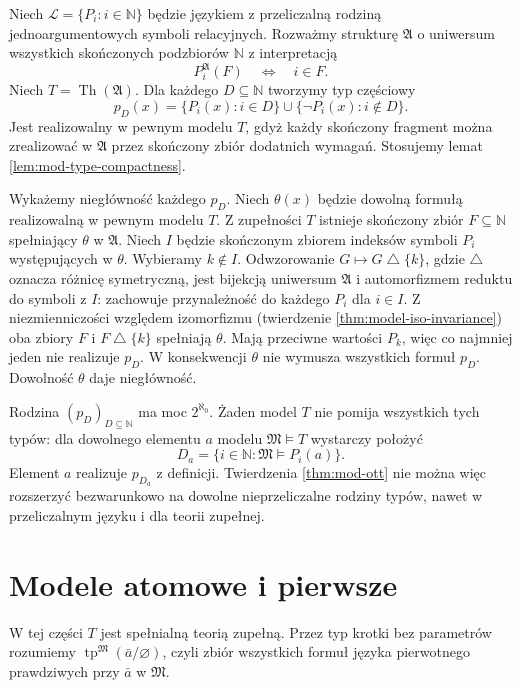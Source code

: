 \begin{przyklad}
\label{ex:mod-ott-uncountable-family}
Niech $\mathcal L=\{P_i:i\in\mathbb N\}$ będzie
językiem z przeliczalną rodziną jednoargumentowych
symboli relacyjnych. Rozważmy strukturę
$\mathfrak A$ o uniwersum wszystkich skończonych
podzbiorów $\mathbb N$ z interpretacją
\[
P_i^{\mathfrak A}(F)\quad\Longleftrightarrow\quad i\in F.
\]
Niech $T=\operatorname{Th}(\mathfrak A)$.
Dla każdego $D\subseteq\mathbb N$ tworzymy typ częściowy
\[
p_D(x)=\{P_i(x):i\in D\}
\cup\{\neg P_i(x):i\notin D\}.
\]
Jest realizowalny w pewnym modelu $T$, gdyż
każdy skończony fragment można zrealizować
w $\mathfrak A$ przez skończony zbiór dodatnich
wymagań. Stosujemy lemat \ref{lem:mod-type-compactness}.

Wykażemy niegłówność każdego $p_D$.
Niech $\theta(x)$ będzie dowolną formułą
realizowalną w pewnym modelu $T$.
Z zupełności $T$ istnieje skończony zbiór
$F\subseteq\mathbb N$ spełniający $\theta$ w
$\mathfrak A$. Niech $I$ będzie skończonym
zbiorem indeksów symboli $P_i$ występujących
w $\theta$. Wybieramy $k\notin I$. Odwzorowanie
$G\mapsto G\mathbin{\triangle}\{k\}$, gdzie
$\triangle$ oznacza różnicę symetryczną, jest
bijekcją uniwersum $\mathfrak A$ i automorfizmem
reduktu do symboli z $I$: zachowuje przynależność
do każdego $P_i$ dla $i\in I$.
Z niezmienniczości względem izomorfizmu
(twierdzenie \ref{thm:model-iso-invariance})
oba zbiory $F$ i $F\mathbin{\triangle}\{k\}$
spełniają $\theta$. Mają przeciwne wartości $P_k$,
więc co najmniej jeden nie realizuje $p_D$.
W konsekwencji $\theta$ nie wymusza wszystkich
formuł $p_D$. Dowolność $\theta$ daje niegłówność.

Rodzina $(p_D)_{D\subseteq\mathbb N}$ ma moc
$2^{\aleph_0}$. Żaden model $T$ nie pomija wszystkich
tych typów: dla dowolnego elementu $a$ modelu
$\mathfrak M\models T$ wystarczy położyć
\[
D_a=\{i\in\mathbb N:\mathfrak M\models P_i(a)\}.
\]
Element $a$ realizuje $p_{D_a}$ z definicji.
Twierdzenia \ref{thm:mod-ott} nie można więc
rozszerzyć bezwarunkowo na dowolne nieprzeliczalne
rodziny typów, nawet w przeliczalnym języku
i dla teorii zupełnej.
\end{przyklad}


\section{Modele atomowe i pierwsze}

W tej części $T$ jest spełnialną teorią zupełną.
Przez typ krotki bez parametrów rozumiemy
$\operatorname{tp}^{\mathfrak M}(\bar a/\varnothing)$,
czyli zbiór wszystkich formuł języka pierwotnego
prawdziwych przy $\bar a$ w $\mathfrak M$.

